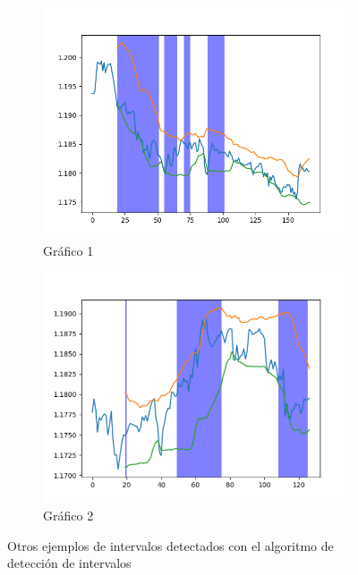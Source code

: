 \begin{figure}[!tbp]
	\begin{subfigure}[b]{0.6\textwidth}
		\includegraphics[width=\textwidth]{imagenes/intervalos1.png}
		\caption{Gráfico 1}
	\end{subfigure}
	\hfill
	\begin{subfigure}[b]{0.6\textwidth}
		\includegraphics[width=\textwidth]{imagenes/intervalos2.png}
		\caption{Gráfico 2}
	\end{subfigure}
	
	\caption{Otros ejemplos de intervalos detectados con el algoritmo de detección de intervalos}
\end{figure}

